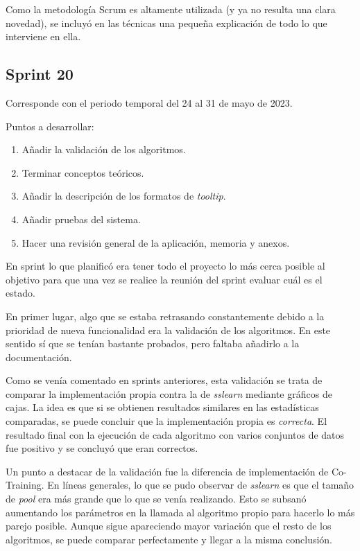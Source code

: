 Como la metodología Scrum es altamente utilizada (y ya no resulta una clara
novedad), se incluyó en las técnicas una pequeña explicación de todo lo que
interviene en ella.

\subsection{Sprint 20}
Corresponde con el periodo temporal del 24 al 31 de mayo de 2023.

Puntos a desarrollar:
\begin{enumerate}
    \item Añadir la validación de los algoritmos.
    \item Terminar conceptos teóricos.
    \item Añadir la descripción de los formatos de \textit{tooltip}.
    \item Añadir pruebas del sistema.
    \item Hacer una revisión general de la aplicación, memoria y anexos.
\end{enumerate}

En sprint lo que planificó era tener todo el proyecto lo más cerca posible al
objetivo para que una vez se realice la reunión del sprint evaluar cuál es el
estado.

En primer lugar, algo que se estaba retrasando constantemente debido a la
prioridad de nueva funcionalidad era la validación de los algoritmos. En este
sentido sí que se tenían bastante probados, pero faltaba añadirlo a la
documentación.

Como se venía comentado en sprints anteriores, esta validación se trata de
comparar la implementación propia contra la de \emph{sslearn} mediante gráficos
de cajas. La idea es que si se obtienen resultados similares en las estadísticas
comparadas, se puede concluir que la implementación propia es \emph{correcta}.
El resultado final con la ejecución de cada algoritmo con varios conjuntos de
datos fue positivo y se concluyó que eran correctos.

Un punto a destacar de la validación fue la diferencia de implementación de
Co-Training. En líneas generales, lo que se pudo observar de \emph{sslearn} es
que el tamaño de \textit{pool} era más grande que lo que se venía realizando.
Esto se subsanó aumentando los parámetros en la llamada al algoritmo propio para
hacerlo lo más parejo posible. Aunque sigue apareciendo mayor variación que el
resto de los algoritmos, se puede comparar perfectamente y llegar a la misma
conclusión.

